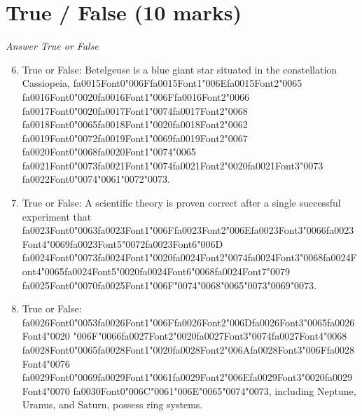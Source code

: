 \documentclass[12pt]{article}
\begin{document}
\section*{True / False (10 marks)}
\textit{Answer True or False}
\begin{enumerate}[label=\arabic*.]
\setcounter{enumi}{5}
\item True or False: Betelgeuse is a blue giant star situated in the constellation Cassiopeia, {\csname fa0015Font0\endcsname\char"006F}{\csname fa0015Font1\endcsname\char"006E}{\csname fa0015Font2\endcsname\char"0065} {\csname fa0016Font0\endcsname\char"0020}{\csname fa0016Font1\endcsname\char"006F}{\csname fa0016Font2\endcsname\char"0066} {\csname fa0017Font0\endcsname\char"0020}{\csname fa0017Font1\endcsname\char"0074}{\csname fa0017Font2\endcsname\char"0068} {\csname fa0018Font0\endcsname\char"0065}{\csname fa0018Font1\endcsname\char"0020}{\csname fa0018Font2\endcsname\char"0062} {\csname fa0019Font0\endcsname\char"0072}{\csname fa0019Font1\endcsname\char"0069}{\csname fa0019Font2\endcsname\char"0067} {\csname fa0020Font0\endcsname\char"0068}{\csname fa0020Font1\endcsname\char"0074}{\char"0065} {\csname fa0021Font0\endcsname\char"0073}{\csname fa0021Font1\endcsname\char"0074}{\csname fa0021Font2\endcsname\char"0020}{\csname fa0021Font3\endcsname\char"0073} {\csname fa0022Font0\endcsname\char"0074}{\char"0061}{\char"0072}{\char"0073}.
\item True or False: A scientific theory is proven correct after a single successful experiment that {\csname fa0023Font0\endcsname\char"0063}{\csname fa0023Font1\endcsname\char"006F}{\csname fa0023Font2\endcsname\char"006E}{\csname fa0023Font3\endcsname\char"0066}{\csname fa0023Font4\endcsname\char"0069}{\csname fa0023Font5\endcsname\char"0072}{\csname fa0023Font6\endcsname\char"006D} {\csname fa0024Font0\endcsname\char"0073}{\csname fa0024Font1\endcsname\char"0020}{\csname fa0024Font2\endcsname\char"0074}{\csname fa0024Font3\endcsname\char"0068}{\csname fa0024Font4\endcsname\char"0065}{\csname fa0024Font5\endcsname\char"0020}{\csname fa0024Font6\endcsname\char"0068}{\csname fa0024Font7\endcsname\char"0079} {\csname fa0025Font0\endcsname\char"0070}{\csname fa0025Font1\endcsname\char"006F}{\char"0074}{\char"0068}{\char"0065}{\char"0073}{\char"0069}{\char"0073}.
\item True or False: {\csname fa0026Font0\endcsname\char"0053}{\csname fa0026Font1\endcsname\char"006F}{\csname fa0026Font2\endcsname\char"006D}{\csname fa0026Font3\endcsname\char"0065}{\csname fa0026Font4\endcsname\char"0020} {\char"006F}{\char"0066}{\csname fa0027Font2\endcsname\char"0020}{\csname fa0027Font3\endcsname\char"0074}{\csname fa0027Font4\endcsname\char"0068} {\csname fa0028Font0\endcsname\char"0065}{\csname fa0028Font1\endcsname\char"0020}{\csname fa0028Font2\endcsname\char"006A}{\csname fa0028Font3\endcsname\char"006F}{\csname fa0028Font4\endcsname\char"0076} {\csname fa0029Font0\endcsname\char"0069}{\csname fa0029Font1\endcsname\char"0061}{\csname fa0029Font2\endcsname\char"006E}{\csname fa0029Font3\endcsname\char"0020}{\csname fa0029Font4\endcsname\char"0070} {\csname fa0030Font0\endcsname\char"006C}{\char"0061}{\char"006E}{\char"0065}{\char"0074}{\char"0073}, including Neptune, Uranus, and Saturn, possess ring systems.

\end{enumerate}
\end{document}
